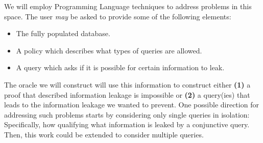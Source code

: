\documentclass{article}
\begin{document}
We will employ Programming Language techniques to address
problems in this space.
%
The user \emph{may} be asked to provide some of the following
elements:

\begin{itemize}
\item The fully populated database.
\item A policy which describes what types of queries are allowed.
\item A query which asks if it is possible for certain information to
leak.
\end{itemize}

The oracle we will construct will use this information to construct
either \textbf{(1)} a proof that described information leakage is
impossible or \textbf{(2)} a query(ies) that leads to the information
leakage we wanted to prevent.
%
One possible direction for addressing such problems starts by
considering only single queries in isolation: Specifically, how
qualifying what information is leaked by a conjunctive query.
%
Then, this work could be extended to consider multiple queries.
\end{document}

